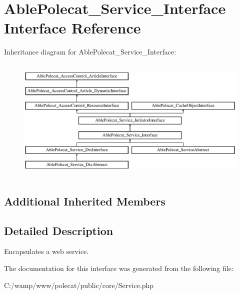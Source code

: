 \hypertarget{interface_able_polecat___service___interface}{}\section{Able\+Polecat\+\_\+\+Service\+\_\+\+Interface Interface Reference}
\label{interface_able_polecat___service___interface}
Inheritance diagram for Able\+Polecat\+\_\+\+Service\+\_\+\+Interface\+:\begin{figure}[H]
\begin{center}
\leavevmode
\includegraphics[height=5.975610cm]{interface_able_polecat___service___interface}
\end{center}
\end{figure}
\subsection*{Additional Inherited Members}


\subsection{Detailed Description}
Encapsulates a web service. 

The documentation for this interface was generated from the following file\+:\begin{DoxyCompactItemize}
\item 
C\+:/wamp/www/polecat/public/core/Service.\+php\end{DoxyCompactItemize}
